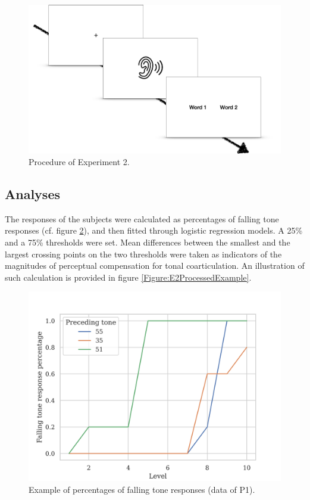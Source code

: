 \documentclass[12pt]{report}
\begin{document}
\begin{CJK}{UTF8}{bsmi}
\begin{figure}[h]
\centering
\includegraphics[scale=.25]{Figures/E2/Procedure.png}
\caption{Procedure of Experiment 2.}
\label{Figure:Experiment2Procedure}
\end{figure}

\subsection{Analyses}
The responses of the subjects were calculated as percentages of falling tone responses (cf. figure \ref{Figure:E2RawExample}), and then fitted through logistic regression models. A 25\% and a 75\% thresholds were set. Mean differences between the smallest and the largest crossing points on the two thresholds were taken as indicators of the magnitudes of perceptual compensation for tonal coarticulation. An illustration of such calculation is provided in figure \ref{Figure:E2ProcessedExample}.

\begin{figure}[h]
\centering
\includegraphics[scale=1]{Figures/E2/RawExample.png}
\caption{Example of percentages of falling tone responses (data of P1).}
\label{Figure:E2RawExample}
\end{figure}


\end{CJK}
\end{document}
